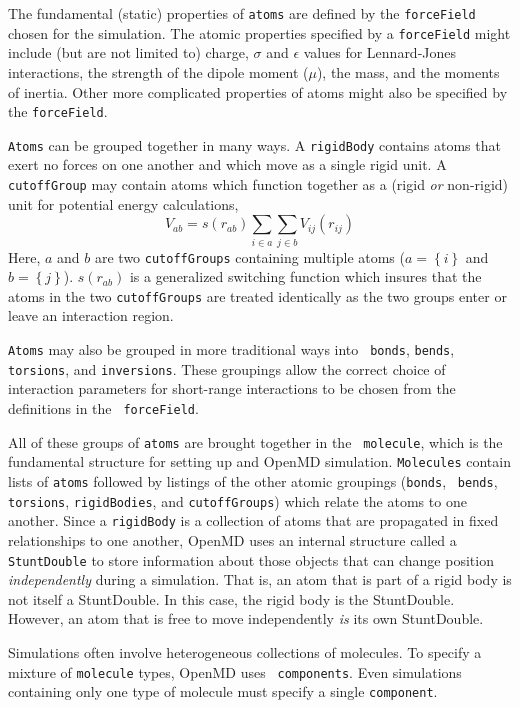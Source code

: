 \documentclass[]{book}
\begin{document}
The fundamental (static) properties of {\tt atoms} are defined by the
{\tt forceField} chosen for the simulation.  The atomic properties
specified by a {\tt forceField} might include (but are not limited to)
charge, $\sigma$ and $\epsilon$ values for Lennard-Jones interactions,
the strength of the dipole moment ($\mu$), the mass, and the moments
of inertia.  Other more complicated properties of atoms might also be
specified by the {\tt forceField}.

{\tt Atoms} can be grouped together in many ways.  A {\tt rigidBody}
contains atoms that exert no forces on one another and which move as a
single rigid unit.  A {\tt cutoffGroup} may contain atoms which
function together as a (rigid {\it or} non-rigid) unit for potential
energy calculations,
\begin{equation}
V_{ab} = s(r_{ab}) \sum_{i \in a} \sum_{j \in b} V_{ij}(r_{ij})
\end{equation}
Here, $a$ and $b$ are two {\tt cutoffGroups} containing multiple atoms
($a = \left\{i\right\}$ and $b = \left\{j\right\}$).  $s(r_{ab})$ is a
generalized switching function which insures that the atoms in the two
{\tt cutoffGroups} are treated identically as the two groups enter or
leave an interaction region.

{\tt Atoms} may also be grouped in more traditional ways into {\tt
  bonds}, {\tt bends}, {\tt torsions}, and {\tt inversions}.  These
groupings allow the correct choice of interaction parameters for
short-range interactions to be chosen from the definitions in the {\tt
  forceField}.

All of these groups of {\tt atoms} are brought together in the {\tt
molecule}, which is the fundamental structure for setting up and {\sc
OpenMD} simulation.  {\tt Molecules} contain lists of {\tt atoms}
followed by listings of the other atomic groupings ({\tt bonds}, {\tt
bends}, {\tt torsions}, {\tt rigidBodies}, and {\tt cutoffGroups})
which relate the atoms to one another.  Since a {\tt rigidBody} is a
collection of atoms that are propagated in fixed relationships to one
another, {\sc OpenMD} uses an internal structure called a {\tt
StuntDouble} to store information about those objects that can change
position {\it independently} during a simulation.  That is, an atom
that is part of a rigid body is not itself a StuntDouble.  In this
case, the rigid body is the StuntDouble.  However, an atom that is
free to move independently {\it is} its own StuntDouble.

Simulations often involve heterogeneous collections of molecules.  To
specify a mixture of {\tt molecule} types, {\sc OpenMD} uses {\tt
components}.  Even simulations containing only one type of molecule
must specify a single {\tt component}.
\end{document}
